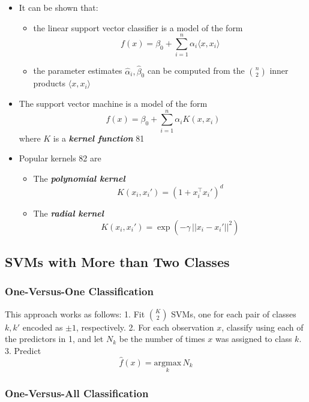 \documentclass[11pt]{article}
\providecommand{\tightlist}{%
      \setlength{\itemsep}{0pt}\setlength{\parskip}{0pt}}
\begin{document}
    \begin{itemize}
\item
  It can be shown that:

  \begin{itemize}
  \tightlist
  \item
    the linear support vector classifier is a model of the form
    \[f(x) = \beta_0 + \sum_{i = 1}^n \alpha_i \langle x, x_i\rangle \]
  \item
    the parameter estimates \(\hat{\alpha}_i, \hat{\beta}_0\) can be
    computed from the \(\binom{n}{2}\) inner products
    \(\langle x, x_i \rangle\)
  \end{itemize}
\item
  The support vector machine is a model of the form
  \[f(x) = \beta_0 + \sum_{i = 1}^n \alpha_i K(x, x_i) \] where \(K\) is
  a \textbf{\emph{kernel function}} 81 
\item
  Popular kernels 82 are

  \begin{itemize}
  \tightlist
  \item
    The \textbf{\emph{polynomial kernel}}
    \[K(x_i, x_i') = (1 + x_i^\top x_i')^d\]
  \item
    The \textbf{\emph{radial kernel}}
    \[K(x_i, x_i') = \exp(-\gamma\,||x_i - x_i'||^2)\]
  \end{itemize}
\end{itemize}

    \hypertarget{svms-with-more-than-two-classes}{%
\subsection{SVMs with More than Two
Classes}\label{svms-with-more-than-two-classes}}

    \hypertarget{one-versus-one-classification}{%
\subsubsection{One-Versus-One
Classification}\label{one-versus-one-classification}}

    This approach works as follows: 1. Fit \(\binom{K}{2}\) SVMs, one for
each pair of classes \(k,k'\) encoded as \(\pm 1\), respectively. 2. For
each observation \(x\), classify using each of the predictors in 1, and
let \(N_k\) be the number of times \(x\) was assigned to class \(k\). 3.
Predict \[ \hat{f}(x) = \underset{k}{\text{argmax}}\, N_k\]

    \hypertarget{one-versus-all-classification}{%
\subsubsection{One-Versus-All
Classification}\label{one-versus-all-classification}}
\end{document}
